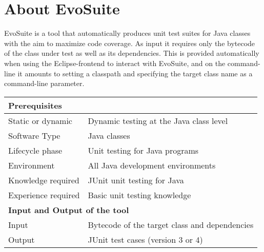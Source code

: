 \documentclass[runningheads,a4paper]{llncs}
\newcommand{\EVOSUITE}{{\sc EvoSuite}\xspace}
\begin{document}
\section{About \EVOSUITE}

\EVOSUITE is a tool that automatically produces unit test suites for
Java classes with the aim to maximize code coverage. As input it
requires only the bytecode of the class under test as well as its
dependencies. This is provided automatically when using the
Eclipse-frontend to interact with \EVOSUITE, and on the command-line
it amounts to setting a classpath and specifying the target class name
as a command-line parameter.

\begin{table}[t] %
\centering
    \renewcommand{\arraystretch}{1.2}

    \begin{tabular}{|l|p{5cm}|}
      \hline
      \multicolumn{2}{|l|}{{\bf Prerequisites}} \\
      \hline
  Static or dynamic &  Dynamic testing at the Java class level\\
  Software Type &  Java classes\\
  Lifecycle phase&  Unit testing for Java programs\\
  Environment&  All Java development environments \\
  Knowledge required & JUnit unit testing for Java\\
  Experience required &  Basic unit testing knowledge\\
     \hline
      \multicolumn{2}{|l|}{{\bf Input and Output of the tool}} \\
      \hline
 Input & Bytecode of the target class and dependencies \\
    \hline
Output&  JUnit test cases (version 3 or 4)\\
     

\end{tabular}
\end{table}
\end{document}
